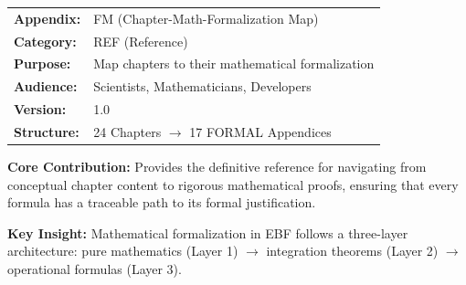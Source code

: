 \begin{tcolorbox}[colback=blue!5!white, colframe=blue!75!black,
    title=\textbf{Appendix FM: REF-FORMALMAP}]

\begin{tabular}{@{}ll@{}}
\textbf{Appendix:} & FM (Chapter-Math-Formalization Map) \\
\textbf{Category:} & REF (Reference) \\
\textbf{Purpose:} & Map chapters to their mathematical formalization \\
\textbf{Audience:} & Scientists, Mathematicians, Developers \\
\textbf{Version:} & 1.0 \\
\textbf{Structure:} & 24 Chapters $\rightarrow$ 17 FORMAL Appendices \\
\end{tabular}

\tcblower

\textbf{Core Contribution:} Provides the definitive reference for navigating
from conceptual chapter content to rigorous mathematical proofs, ensuring
that every formula has a traceable path to its formal justification.

\textbf{Key Insight:} Mathematical formalization in EBF follows a three-layer
architecture: pure mathematics (Layer 1) $\rightarrow$ integration theorems
(Layer 2) $\rightarrow$ operational formulas (Layer 3).

\end{tcolorbox}

